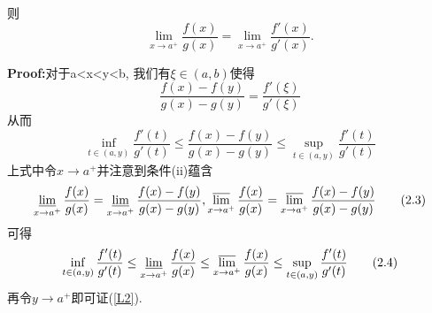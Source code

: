 \documentclass{ctexart}
\begin{document}
则
\begin{equation}
\lim_{x\rightarrow a^+} {\frac{f(x)}{g(x)}}=\lim_{x\rightarrow a^+} {\frac{f'(x)}{g'(x)}}.\tag{T2}\label{L2}
\end{equation}

\textbf{Proof:}对于a<x<y<b, 我们有$\xi\in(a,b)$使得
\begin{equation}
\frac{f(x)-f(y)}{g(x)-g(y)}=\frac{f'(\xi)}{g'(\xi)}\tag{2.1}
\end{equation}
从而
\begin{equation}
\inf_{t\in(a,y)}\frac{f'(t)}{g'(t)}\leq\frac{f(x)-f(y)}{g(x)-g(y)}\leq\sup_{t\in(a,y)}\frac{f'(t)}{g'(t)}\tag{2.2}
\end{equation}
上式中令$x\rightarrow a^+$并注意到条件(ii)蕴含
\begin{equation}
\varliminf_{x\rightarrow a^+}\frac{f(x)}{g(x)}=\varliminf_{x\rightarrow a^+}\frac{f(x)-f(y)}{g(x)-g(y)}, 
\varlimsup_{x\rightarrow a^+}\frac{f(x)}{g(x)}=\varlimsup_{x\rightarrow a^+}\frac{f(x)-f(y)}{g(x)-g(y)}\tag{2.3}
\end{equation}
可得
\begin{equation}
\inf_{t\in(a,y)}\frac{f'(t)}{g'(t)}\leq\varliminf_{x\rightarrow a^+}\frac{f(x)}{g(x)}
\leq\varlimsup_{x\rightarrow a^+}\frac{f(x)}{g(x)}\leq\sup_{t\in(a,y)}\frac{f'(t)}{g'(t)}\tag{2.4}
\end{equation}
再令$y\rightarrow a^+$即可证(\ref{L2}).
\end{document}
